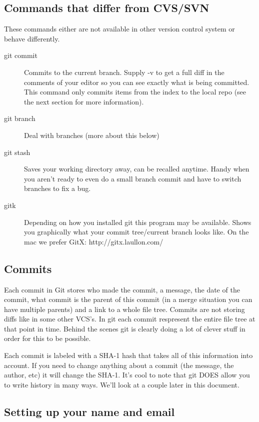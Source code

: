 \documentclass[letterpaper,12pt]{article}
\begin{document}
\subsection{Commands that differ from CVS/SVN}
These commands either are not available in other version control system or
behave differently.

\begin{description}
\item [git commit] Commits to the current branch. Supply -v to get a full diff
  in the comments of your editor so you can see exactly what is being
  committed. This command only commits items from the index to the local repo
  (see the next section for more information).
\item [git branch] Deal with branches (more about this below)
\item [git stash] Saves your working directory away, can be recalled
  anytime. Handy when you aren't ready to even do a small branch commit and have
  to switch branches to fix a bug.
\item [gitk] Depending on how you installed git this program may be
  available. Shows you graphically what your commit tree/current branch looks
  like. On the mac we prefer GitX: http://gitx.laullon.com/
\end{description}

\subsection{Commits}
Each commit in Git stores who made the commit, a message, the date of the
commit, what commit is the parent of this commit (in a merge situation you can
have multiple parents) and a link to a whole file tree. Commits are not storing
diffs like in some other VCS's. In git each commit respresent the entire file
tree at that point in time. Behind the scenes git is clearly doing a lot of
clever stuff in order for this to be possible.

Each commit is labeled with a SHA-1 hash that takes all of this information into
account. If you need to change anything about a commit (the message, the author,
etc) it will change the SHA-1. It's cool to note that git DOES allow you to
write history in many ways. We'll look at a couple later in this document.

\subsection{Setting up your name and email}
\end{document}
